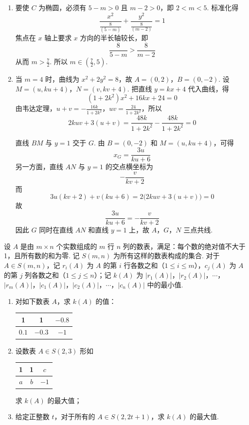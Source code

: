 \begin{solution}
\begin{enumerate}
\item 要使 \(C\) 为椭圆，必须有 \(5-m>0\) 且 \(m-2>0\)，即 \(2<m<5\). 标准化得
\[
\frac{x^2}{\frac{8}{(5-m)}}+\frac{y^2}{\frac{8}{(m-2)}}=1
\]
焦点在 \(x\) 轴上要求 \(x\) 方向的半长轴较长，即
\[
\frac{8}{5-m}>\frac{8}{m-2}
\]
从而 \(m>\frac72\). 所以 \(m\in\left(\frac72,5\right)\).
\item 当 \(m=4\) 时，曲线为 \(x^2+2y^2=8\)，故 \(A=(0,2)\)，\(B=(0,-2)\).
设 \(M=(u,ku+4)\)，\(N=(v,kv+4)\).
把直线 \(y=kx+4\) 代入曲线，得
\[
(1+2k^2)x^2+16kx+24=0
\]
由韦达定理，\(u+v=-\frac{16k}{1+2k^2}\)，\(uv=\frac{24}{1+2k^2}\)，所以
\[
2kuv+3(u+v)=\frac{48k}{1+2k^2}-\frac{48k}{1+2k^2}=0
\]

直线 \(BM\) 与 \(y=1\) 交于 \(G\). 由 \(B=(0,-2)\) 和 \(M=(u,ku+4)\)，可得
\[
x_G=\frac{3u}{ku+6}
\]
另一方面，直线 \(AN\) 与 \(y=1\) 的交点横坐标为
\[
-\frac{v}{kv+2}
\]
而
\[
3u(kv+2)+v(ku+6)=2\bigl(2kuv+3(u+v)\bigr)=0
\]
故
\[
\frac{3u}{ku+6}=-\frac{v}{kv+2}
\]
因此 \(G\) 同时在直线 \(AN\) 和直线 \(y=1\) 上，故 \(A\)，\(G\)，\(N\) 三点共线.
\end{enumerate}
\end{solution}

\begin{problem}
设 \(A\) 是由 \(m\times n\) 个实数组成的 \(m\) 行 \(n\) 列的数表，满足：每个数的绝对值不大于 1，且所有数的和为零. 记 \(S(m,n)\) 为所有这样的数表构成的集合. 对于 \(A\in S(m,n)\)，记 \(r_i(A)\) 为 \(A\) 的第 \(i\) 行各数之和（\(1\le i\le m\)），\(c_j(A)\) 为 \(A\) 的第 \(j\) 列各数之和（\(1\le j\le n\)）；记 \(k(A)\) 为 \(|r_1(A)|\)，\(|r_2(A)|\)，\(\cdots\)，\(|r_m(A)|\)，\(|c_1(A)|\)，\(|c_2(A)|\)，\(\cdots\)，\(|c_n(A)|\) 中的最小值.

\begin{enumerate}
\item 对如下数表 \(A\)，求 \(k(A)\) 的值：

\begin{center}
\renewcommand{\arraystretch}{1.2}
\begin{tabular}{|c|c|c|}
\hline
1 & 1 & \(-0.8\) \\
\hline
\(0.1\) & \(-0.3\) & \(-1\) \\
\hline
\end{tabular}
\end{center}

\item 设数表 \(A\in S(2,3)\) 形如

\begin{center}
\renewcommand{\arraystretch}{1.2}
\begin{tabular}{|c|c|c|}
\hline
1 & 1 & \(c\) \\
\hline
\(a\) & \(b\) & \(-1\) \\
\hline
\end{tabular}
\end{center}

求 \(k(A)\) 的最大值；
\item 给定正整数 \(t\)，对于所有的 \(A\in S(2,2t+1)\)，求 \(k(A)\) 的最大值.
\end{enumerate}
\end{problem}

